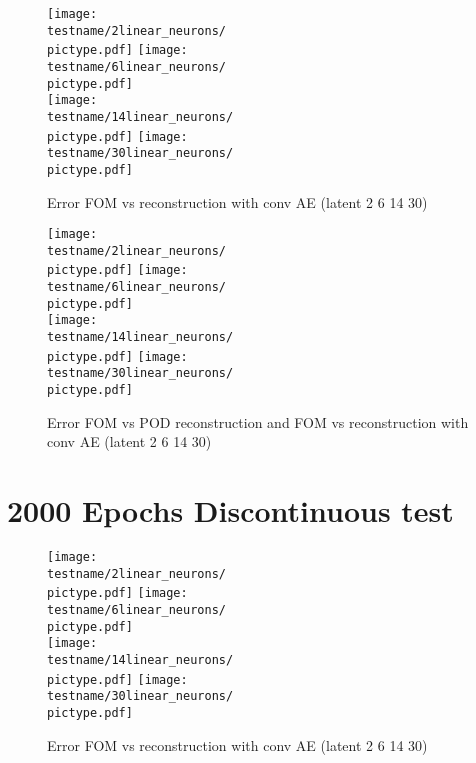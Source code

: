\documentclass[USenglish]{article}
\newcommand{\1}{\begin{pmatrix}
		1\\
		1
\end{pmatrix}}
\begin{document}
\begin{figure}
	\newcommand{\pictype}{Error_convAE-FOM}
	\texttt{[image: \\testname/2linear\_neurons/\\pictype.pdf]}
	\texttt{[image: \\testname/6linear\_neurons/\\pictype.pdf]}\\
	\texttt{[image: \\testname/14linear\_neurons/\\pictype.pdf]}
	\texttt{[image: \\testname/30linear\_neurons/\\pictype.pdf]}
	\caption{Error FOM vs reconstruction with conv AE (latent 2 6 14 30)}
\end{figure}

\begin{figure}
	\newcommand{\pictype}{Error_POD-inv_transform}
	\texttt{[image: \\testname/2linear\_neurons/\\pictype.pdf]}
	\texttt{[image: \\testname/6linear\_neurons/\\pictype.pdf]}\\
	\texttt{[image: \\testname/14linear\_neurons/\\pictype.pdf]}
	\texttt{[image: \\testname/30linear\_neurons/\\pictype.pdf]}
	\caption{Error FOM vs POD reconstruction and FOM vs reconstruction with conv AE (latent 2 6 14 30)}
\end{figure}




\newpage
\section{2000 Epochs Discontinuous test}
\renewcommand{\testname}{../Stochastic_results/discontinuity_tests/discontinuity_6_conv/conv_AE_2000epochs}

\begin{figure}
	\newcommand{\pictype}{Error_convAE-FOM}
	\texttt{[image: \\testname/2linear\_neurons/\\pictype.pdf]}
	\texttt{[image: \\testname/6linear\_neurons/\\pictype.pdf]}\\
	\texttt{[image: \\testname/14linear\_neurons/\\pictype.pdf]}
	\texttt{[image: \\testname/30linear\_neurons/\\pictype.pdf]}
	\caption{Error FOM vs reconstruction with conv AE (latent 2 6 14 30)}
\end{figure}
\end{document}
